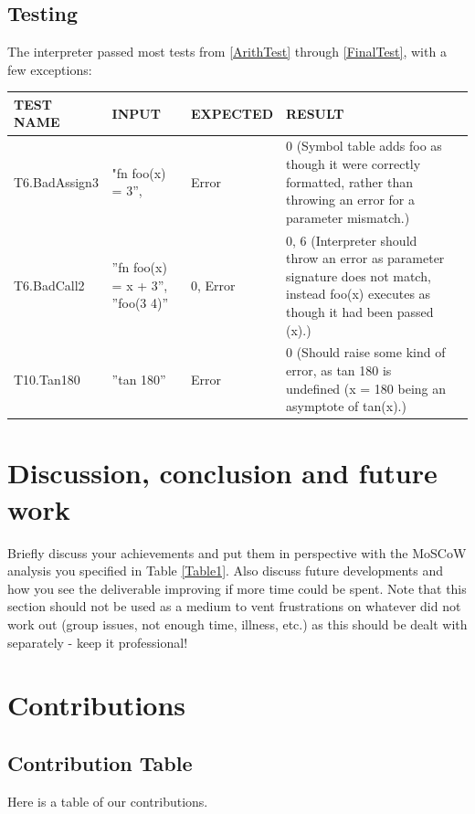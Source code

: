 \documentclass[a4paper, oneside, 11pt]{report}
\begin{document}
    \clearpage
    \section{Testing}
    The interpreter passed most tests from \ref{ArithTest} through \ref{FinalTest}, with a few exceptions:
    \begin{center}
        \begin{tabular}{|p{1.5in}|p{1.5in}|p{1in}|p{1.6in}|p{2.4in}|}
            \hline
            TEST NAME & INPUT & EXPECTED & RESULT \\
            \hline
            T6.BadAssign3 & "fn foo(x) = 3”, & Error & 0 (Symbol table adds foo as though it were correctly formatted, rather than throwing an error for a parameter mismatch.) \\
            \hline
            T6.BadCall2 & ”fn foo(x) = x + 3”, ”foo(3 4)” & 0, Error & 0, 6 (Interpreter should throw an error as parameter signature does not match, instead foo(x) executes as though it had been passed (x).) \\
            \hline
            T10.Tan180 & ”tan 180” & Error & 0 (Should raise some kind of error, as tan 180 is undefined (x = 180 being an asymptote of tan(x).) \\
            \hline
        \end{tabular}
    \end{center}


    \chapter{Discussion, conclusion and future work}

    Briefly discuss your achievements and put them in perspective with the MoSCoW analysis you specified in Table \ref{Table1}. Also discuss future developments and how you see the deliverable improving if more time could be spent. Note that this section should not be used as a medium to vent frustrations on whatever did not work out (group issues, not enough time, illness, etc.) as this should be dealt with separately - keep it professional!


    
    


    \appendix
    \chapter{Contributions}
    \section{Contribution Table}
    Here is a table of our contributions. \\
\end{document}
